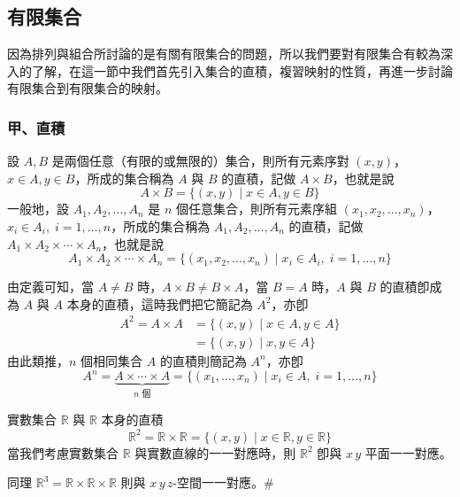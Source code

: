 \subsection{有限集合}\label{sec:b5-2-1}

因為排列與組合所討論的是有關有限集合的問題，所以我們要對有限集合有較為深入的了解，在這一節中我們首先引入集合的直積，複習映射的性質，再進一步討論有限集合到有限集合的映射。

\subsubsection*{甲、直積}

\begin{definition*}
設 $A, B$ 是兩個任意（有限的或無限的）集合，則所有元素序對 $(x, y)$，$x \in A, y \in B$，所成的集合稱為 $A$ 與 $B$ 的直積，記做 $A \times B$，也就是說
\[
A \times B = \{(x, y) \mid x \in A, y \in B\}
\]
一般地，設 $A_1, A_2, \ldots, A_n$ 是 $n$ 個任意集合，則所有元素序組 $(x_1, x_2, \ldots, x_n)$，$x_i \in A_i,\; i = 1, \ldots, n$，所成的集合稱為 $A_1, A_2, \ldots, A_n$ 的直積，記做 $A_1 \times A_2 \times \cdots \times A_n$，也就是說
\[
A_1 \times A_2 \times \cdots \times A_n = \{(x_1, x_2, \ldots, x_n) \mid x_i \in A_i,\; i = 1, \ldots, n\}
\]
\end{definition*}
由定義可知，當 $A \ne B$ 時，$A \times B \ne B \times A$，當 $B = A$ 時，$A$ 與 $B$ 的直積卽成為 $A$ 與 $A$ 本身的直積，這時我們把它簡記為 $A^2$，亦卽
\begin{align*}
A^2 = A \times A &= \{(x, y) \mid x \in A, y \in A\} \\
&= \{(x, y) \mid x, y \in A\}
\end{align*}
由此類推，$n$ 個相同集合 $A$ 的直積則簡記為 $A^n$，亦卽
\[
A^n = \underbrace{A \times \cdots \times A}_{n\text{ 個}} = \{(x_1, \ldots, x_n) \mid x_i \in A,\; i = 1, \ldots, n\}
\]

\medskip
\begin{example}\label{ex:b5-2-1}
實數集合 $\mathbb{R}$ 與 $\mathbb{R}$ 本身的直積
\[
\mathbb{R}^2 = \mathbb{R} \times \mathbb{R} = \{(x, y) \mid x \in \mathbb{R}, y \in \mathbb{R}\}
\]
當我們考慮實數集合 $\mathbb{R}$ 與實數直線的一一對應時，則 $\mathbb{R}^2$ 卽與 $x\,y$ 平面一一對應。

同理 $\mathbb{R}^3 = \mathbb{R} \times \mathbb{R} \times \mathbb{R}$ 則與 $x\,y\,z$-空間一一對應。\hfill $\#$
\end{example}

